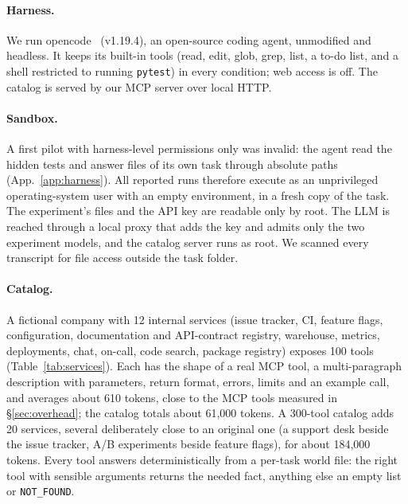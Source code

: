 \paragraph{Harness.} We run opencode~\citep{opencode} (v1.19.4), an open-source coding agent, unmodified and
headless. It keeps its built-in tools (read, edit, glob, grep, list, a to-do list, and a shell restricted to
running \texttt{pytest}) in every condition; web access is off. The catalog is served by our MCP server over
local HTTP.

\paragraph{Sandbox.} A first pilot with harness-level permissions only was invalid: the agent read the hidden
tests and answer files of its own task through absolute paths (App.~\ref{app:harness}). All reported runs
therefore execute as an unprivileged operating-system user with an empty environment, in a fresh copy of
the task. The experiment's files and the API key are readable only by root. The LLM is reached through a
local proxy that adds the key and admits only the two experiment models, and the catalog server runs as
root. We scanned every transcript for file access outside the task folder.

\paragraph{Catalog.} A fictional company with 12 internal services (issue tracker, CI, feature flags,
configuration, documentation and API-contract registry, warehouse, metrics, deployments, chat, on-call, code
search, package registry) exposes 100 tools (Table~\ref{tab:services}). Each has the shape of a real MCP tool,
a multi-paragraph description with parameters, return format, errors, limits and an example call, and averages
about 610 tokens, close to the MCP tools measured in \S\ref{sec:overhead}; the catalog totals about 61{,}000
tokens. A 300-tool catalog adds 20 services, several deliberately close to an original one (a support desk
beside the issue tracker, A/B experiments beside feature flags), for about 184{,}000 tokens. Every tool
answers deterministically from a per-task world file: the right tool with sensible arguments returns the
needed fact, anything else an empty list or \texttt{NOT\_FOUND}.

